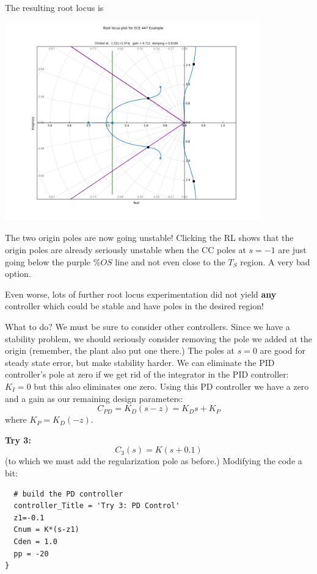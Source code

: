 \begin{ExampleCont}
The resulting root locus is

\begin{center}
\includegraphics[width=111mm]{figs09/R15J19.png}
\end{center}

The two origin poles are now going unstable!  Clicking the RL shows
that the origin poles are already seriously unstable when the
CC poles at $s=-1$ are just going below the purple $\%OS$ line
and not even close to the $T_S$ region.  A very bad option.

Even worse, lots of further root locus experimentation did not yield {\bf any}
controller which could be stable and have poles in the desired region!

What to do?    We must be sure to consider other controllers.
Since we have a stability problem, we should
seriously consider removing the pole we added at the origin
(remember, the plant also put one there.)
The poles at $s=0$ are good for steady state error, but make stability harder.
We can eliminate the PID controller's  pole at zero if we get rid of the integrator in the PID controller: $K_I = 0$ but this also eliminates one zero.  Using this PD controller we have a zero and a gain as our remaining design parameters:
\[
C_{PD} = K_D(s-z) = K_Ds + K_P
\]
where $K_P = K_D(-z)$.

{\bf Try 3: }
\[
C_3(s) = K(s+0.1)
\]
(to which we must add the regularization pole as before.)
Modifying the code a bit:

\begin{verbatim}
  # build the PD controller
  controller_Title = 'Try 3: PD Control'
  z1=-0.1
  Cnum = K*(s-z1)
  Cden = 1.0
  pp = -20
}
\end{verbatim}


\end{ExampleCont}

